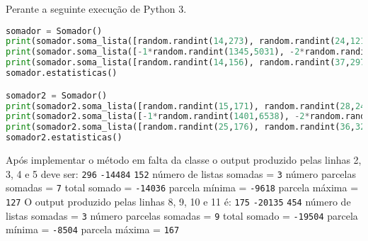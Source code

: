 \documentclass[37pt,varwidth=16cm,border=17pt]{standalone}
\begin{document}
Perante a seguinte execução de Python 3. 

\begin{lstlisting}[language=Python]
somador = Somador()
print(somador.soma_lista([random.randint(14,273), random.randint(24,121), random.randint(24,140)]))
print(somador.soma_lista([-1*random.randint(1345,5031), -2*random.randint(1189, 6392)]))
print(somador.soma_lista([random.randint(14,156), random.randint(37,297)]))
somador.estatisticas()

somador2 = Somador()
print(somador2.soma_lista([random.randint(15,171), random.randint(28,248)]))
print(somador2.soma_lista([-1*random.randint(1401,6538), -2*random.randint(1691, 5503), -3*random.randint(1283,7453)]))
print(somador2.soma_lista([random.randint(25,176), random.randint(36,329), random.randint(7,159), random.randint(5,313)]))
somador2.estatisticas()
\end{lstlisting}


Após implementar o método em falta da classe o output produzido pelas linhas 2, 3, 4 e 5 deve ser:
\newline 
\verb+296+\newline
\verb+-14484+\newline
\verb+152+\newline
número de listas somadas = \verb+3+\newline
número parcelas somadas  = \verb+7+\newline
total somado             = \verb+-14036+\newline
parcela mínima           = \verb+-9618+\newline
parcela máxima           = \verb+127+\newline
\newline
\newline
O output produzido pelas linhas 8, 9, 10 e 11 é:
\newline
\verb+175+\newline
\verb+-20135+\newline
\verb+454+\newline
número de listas somadas = \verb+3+\newline
número parcelas somadas  = \verb+9+\newline
total somado             = \verb+-19504+\newline
parcela mínima           = \verb+-8504+\newline
parcela máxima           = \verb+167+\newline
\end{document}
